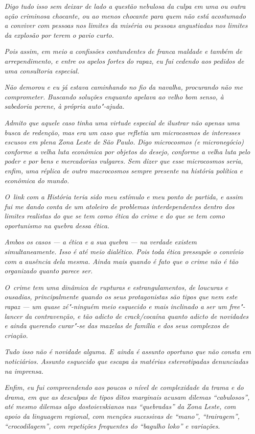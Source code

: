 \emph{Digo tudo isso sem deixar de lado a questão nebulosa da culpa em
uma ou outra ação criminosa chocante, ou ao menos chocante para quem não
está acostumado a conviver com pessoas nos limites da miséria ou pessoas
angustiadas nos limites da explosão por terem o pavio curto.}~

\emph{Pois assim, em meio a confissões contundentes de franca maldade e
também de arrependimento, e entre os apelos fortes do rapaz, eu fui
cedendo aos pedidos de uma consultoria especial.}~

\emph{Não demorou e eu já estava caminhando no fio da navalha,
procurando não me comprometer. Buscando soluções enquanto apelava ao
velho bom senso, à sabedoria perene, à própria auto"-ajuda.}~

\emph{Admito que aquele caso tinha uma virtude especial de ilustrar não
apenas uma busca de redenção, mas era um caso que refletia um
microcosmos de interesses escusos em plena Zona Leste de São Paulo. Digo
microcosmos (e micronegócio) conforme a velha luta econômica por objetos
do desejo, conforme a velha luta pelo poder e por bens e mercadorias
vulgares. Sem dizer que esse microcosmos seria, enfim, uma réplica de
outro macrocosmos sempre presente na história política e econômica do
mundo.}~

\emph{O~link com a História teria sido meu estímulo e meu ponto de
partida, e assim fui me dando conta de um atoleiro de problemas
interdependentes dentro dos limites realistas do que se tem como ética
do crime e do que se tem como oportunismo na quebra dessa ética.}~

\emph{Ambos os casos --- a ética e a sua quebra --- na verdade existem
simultaneamente. Isso é até meio dialético. Pois toda ética pressupõe o
convívio com a ausência dela mesma. Ainda mais quando é fato que o crime
não é tão organizado quanto parece ser.}~

\emph{O~crime tem uma dinâmica de rupturas e estrangulamentos, de
loucuras e ousadias, principalmente quando os seus protagonistas são
tipos que nem este rapaz --- um quase zé"-ninguém meio esquecido e mais
inclinado a ser um free"-lancer da contravenção, e tão adicto de
crack/cocaína quanto adicto de novidades e ainda querendo curar"-se das
mazelas de família e dos seus complexos de criação.}~

\emph{Tudo isso não é novidade alguma. E~ainda é assunto oportuno que
não consta em noticiários. Assunto esquecido que escapa às matérias
estereotipadas denunciadas na imprensa.}

\emph{Enfim, eu fui compreendendo aos poucos o nível de complexidade da
trama e do drama, em que as desculpas de tipos ditos marginais acusam
dilemas ``cabulosos'', até mesmo dilemas algo dostoievskianos nas
``quebradas'' da Zona Leste, com apoio da linguagem regional, com
menções sucessivas de ``mano'', ``trairagem'', ``crocodilagem'', com
repetições frequentes do ``bagulho loko'' e variações.}~

